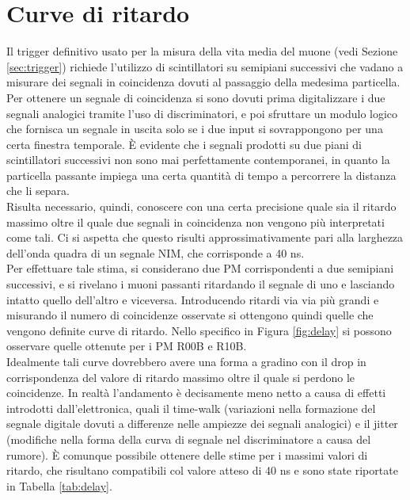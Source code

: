 \documentclass{standalone}
\begin{document}
	\section{Curve di ritardo}
	\label{sec:delay}
	Il trigger definitivo usato per la misura della vita media del muone (vedi Sezione \ref{sec:trigger}) richiede l'utilizzo di scintillatori su semipiani successivi che vadano a misurare dei segnali in coincidenza dovuti al passaggio della medesima particella.\\
	Per ottenere un segnale di coincidenza si sono dovuti prima digitalizzare i due segnali analogici tramite l'uso di discriminatori, e poi sfruttare un modulo logico che fornisca un segnale in uscita solo se i due input si sovrappongono per una certa finestra temporale. \`E evidente che i segnali prodotti su due piani di scintillatori successivi non sono mai perfettamente contemporanei, in quanto la particella passante impiega una certa quantit\`a di tempo a percorrere la distanza che li separa. \\
	Risulta necessario, quindi, conoscere con una certa precisione quale sia il ritardo massimo oltre il quale due segnali in coincidenza non vengono pi\`u interpretati come tali. Ci si aspetta che questo risulti approssimativamente pari alla larghezza dell'onda quadra di un segnale NIM, che corrisponde a 40 ns.\\
	Per effettuare tale stima, si considerano due  PM corrispondenti a due semipiani successivi, e si rivelano i muoni passanti ritardando il segnale di uno e lasciando intatto quello dell'altro e viceversa. Introducendo ritardi via via pi\`u grandi e misurando il numero di coincidenze osservate si ottengono quindi quelle che vengono definite curve di ritardo. Nello specifico in Figura \ref{fig:delay} si possono osservare quelle ottenute per i PM R00B e R10B.\\
	Idealmente tali curve dovrebbero avere una forma a gradino con il drop in corrispondenza del valore di ritardo massimo oltre il quale si perdono le coincidenze. In realt\`a l'andamento \`e decisamente meno netto a causa di effetti introdotti dall'elettronica, quali il time-walk (variazioni nella formazione del segnale digitale dovuti a differenze nelle ampiezze dei segnali analogici)  e il jitter (modifiche nella forma della curva di segnale nel discriminatore a causa del rumore). \`E comunque possibile ottenere delle stime per i massimi valori di ritardo, che risultano compatibili col valore atteso di 40 ns e sono state riportate in Tabella \ref{tab:delay}.
\end{document}
